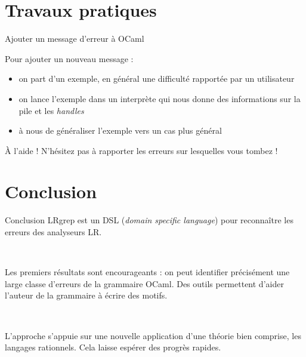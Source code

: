 \documentclass{beamer}          %
\begin{document}
\section{Travaux pratiques}

\begin{frame}{Ajouter un message d'erreur à OCaml}

  Pour ajouter un nouveau message :
  \begin{itemize}
    \item on part d'un exemple, en général une difficulté rapportée par un utilisateur
    \item on lance l'exemple dans un interprète qui nous donne des informations sur la pile et les {\em handles}
    \item à nous de généraliser l'exemple vers un cas plus général
  \end{itemize}
  \pause
  \begin{block}{À l'aide !}
    N'hésitez pas à rapporter les erreurs sur lesquelles vous tombez !
  \end{block}
\end{frame}

\section{Conclusion}

\begin{frame}{Conclusion}
  LRgrep est un DSL ({\em domain specific language}) pour reconnaître les
  erreurs des analyseurs LR.

\

  Les premiers résultats sont encourageants : on peut identifier précisément une large classe d'erreurs de la grammaire OCaml. Des outils permettent d'aider l'auteur de la grammaire à écrire des motifs.

\

  L'approche s'appuie sur une nouvelle application d'une théorie bien comprise, les langages rationnels. Cela laisse espérer des progrès rapides.

\end{frame}
\end{document}
